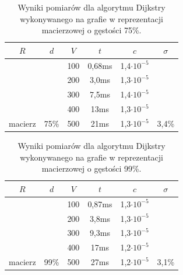 \documentclass[a4paper,12pt]{article}
\begin{document}
\begin{table}[H]
	\centering
	\caption{\centering Wyniki pomiarów dla algorytmu Dijkstry wykonywanego na grafie w reprezentacji macierzowej o gęstości 75\%.}
	\begin{tabular}{|c|c|c|c|c|c|}
		\hline
		\rowcolor[HTML]{C0C0C0} 
		$R$                       & $d$                    & $V$ & $t$    & $c$                & $\sigma$                \\ \hline
		&                        & 100 & 0,68ms & 1,4$\cdot 10^{-5}$ &                         \\ \cline{3-5}
		&                        & 200 & 3,0ms  & 1,3$\cdot 10^{-5}$ &                         \\ \cline{3-5}
		&                        & 300 & 7,5ms  & 1,4$\cdot 10^{-5}$ &                         \\ \cline{3-5}
		&                        & 400 & 13ms   & 1,3$\cdot 10^{-5}$ &                         \\ \cline{3-5}
		\multirow{-5}{*}{macierz} & \multirow{-5}{*}{75\%} & 500 & 21ms   & 1,3$\cdot 10^{-5}$ & \multirow{-5}{*}{3,4\%} \\ \hline
	\end{tabular}
\end{table}

\begin{table}[H]
	\centering
	\caption{\centering Wyniki pomiarów dla algorytmu Dijkstry wykonywanego na grafie w reprezentacji macierzowej o gęstości 99\%.}
	\begin{tabular}{|c|c|c|c|c|c|}
		\hline
		\rowcolor[HTML]{C0C0C0} 
		$R$                       & $d$                    & $V$ & $t$    & $c$                & $\sigma$                \\ \hline
		&                        & 100 & 0,87ms & 1,3$\cdot 10^{-5}$ &                         \\ \cline{3-5}
		&                        & 200 & 3,8ms  & 1,3$\cdot 10^{-5}$ &                         \\ \cline{3-5}
		&                        & 300 & 9,3ms  & 1,3$\cdot 10^{-5}$ &                         \\ \cline{3-5}
		&                        & 400 & 17ms   & 1,2$\cdot 10^{-5}$ &                         \\ \cline{3-5}
		\multirow{-5}{*}{macierz} & \multirow{-5}{*}{99\%} & 500 & 27ms   & 1,2$\cdot 10^{-5}$ & \multirow{-5}{*}{3,1\%} \\ \hline
	\end{tabular}
\end{table}
\end{document}
